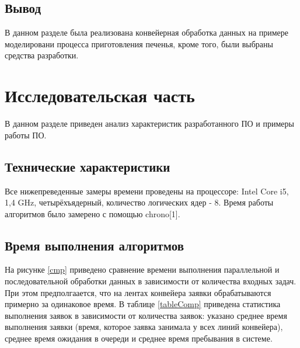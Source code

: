 \documentclass[12pt]{report}
\begin{document}
\section*{Вывод}

В данном разделе была реализована конвейерная обработка данных на примере моделировани процесса приготовления печенья, кроме того, были выбраны средства разработки.

\chapter{Исследовательская часть}

В данном разделе приведен анализ характеристик разработанного ПО  и примеры работы ПО.

\section{Технические характеристики}

Все нижепреведенные замеры времени проведены на процессоре: Intel Core i5, 1,4 GHz, четырёхъядерный, количество логических ядер - 8. Время работы алгоритмов было замерено с помощью chrono[1].

\section{Время выполнения алгоритмов}

На рисунке \ref{cmp} приведено сравнение времени выполнения параллельной и последовательной обработки данных в зависимости от количества входных задач. При этом предполгаается, что на лентах конвейера заявки обрабатываются примерно за одинаковое время. В таблице \ref{tableComp} приведена статистика выполнения заявок в зависимости от количества заявок: указано среднее время выполнения заявки (время, которое заявка занимала у всех линий конвейера), среднее время ожидания в очереди и среднее время пребывания в системе. 
\end{document}
